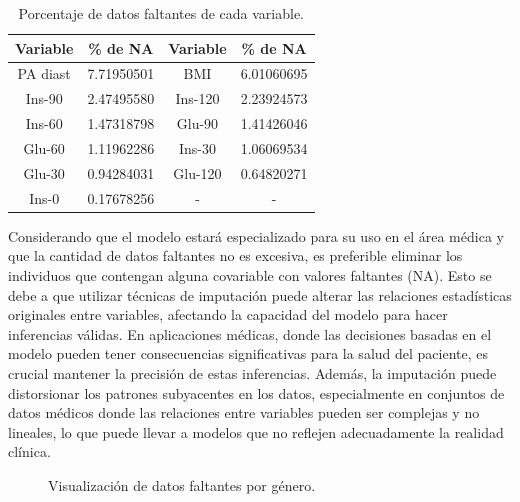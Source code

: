 \begin{table}[H]
\centering
\begin{tabular}{||c|c||c|c||}
\hline\hline
\textbf{Variable} & \textbf{\% de NA} & \textbf{Variable} & \textbf{\% de NA} \\ \hline\hline
PA diast          & 7.71950501        & BMI               & 6.01060695        \\ \hline
Ins-90            & 2.47495580        & Ins-120           & 2.23924573        \\ \hline
Ins-60            & 1.47318798        & Glu-90            & 1.41426046        \\ \hline
Glu-60            & 1.11962286        & Ins-30            & 1.06069534        \\ \hline
Glu-30            & 0.94284031        & Glu-120           & 0.64820271        \\ \hline
Ins-0             & 0.17678256        & -                 & -       \\ \hline\hline
\end{tabular}
\caption{Porcentaje de datos faltantes de cada variable.}
\label{tab:PorcentajeNA}
\end{table}

Considerando que el modelo estará especializado para su uso en el área médica y que la cantidad de datos faltantes no es excesiva, es preferible eliminar los individuos que contengan alguna covariable con valores faltantes (NA). Esto se debe a que utilizar técnicas de imputación puede alterar las relaciones estadísticas originales entre variables, afectando la capacidad del modelo para hacer inferencias válidas. En aplicaciones médicas, donde las decisiones basadas en el modelo pueden tener consecuencias significativas para la salud del paciente, es crucial mantener la precisión de estas inferencias. Además, la imputación puede distorsionar los patrones subyacentes en los datos, especialmente en conjuntos de datos médicos donde las relaciones entre variables pueden ser complejas y no lineales, lo que puede llevar a modelos que no reflejen adecuadamente la realidad clínica.

\begin{figure}[H]
 \centering
    \caption{Visualización de datos faltantes por género.}
    \label{fig:FaltantesGen}
\end{figure}

